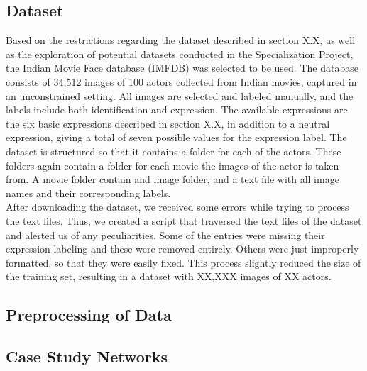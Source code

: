 
\subsection{Dataset} %

Based on the restrictions regarding the dataset described in section X.X, as well as the exploration of potential datasets conducted in the Specialization Project, the Indian Movie Face database (IMFDB) was selected to be used. The database consists of 34,512 images of 100 actors collected from Indian movies, captured in an unconstrained setting. All images are selected and labeled manually, and the labels include both identification and expression. The available expressions are the six basic expressions described in section X.X, in addition to a neutral expression, giving a total of seven possible values for the expression label. The dataset is structured so that it contains a folder for each of the actors. These folders again contain a folder for each movie the images of the actor is taken from. A movie folder contain and image folder, and a text file with all image names and their corresponding labels. \\

\noindent After downloading the dataset, we received some errors while trying to process the text files. Thus, we created a script that traversed the text files of the dataset and alerted us of any peculiarities. Some of the entries were missing their expression labeling and these were removed entirely. Others were just improperly formatted, so that they were easily fixed. This process slightly reduced the size of the training set, resulting in a dataset with XX,XXX images of XX actors.


\subsection{Preprocessing of Data} %


\subsection{Case Study Networks}


